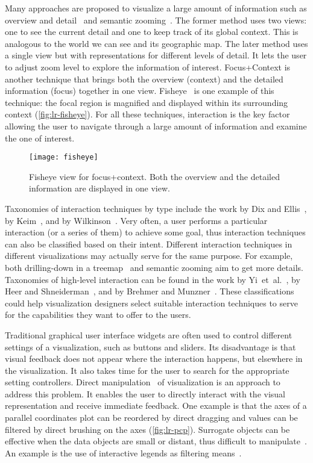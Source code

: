 Many approaches are proposed to visualize a large amount of information such as overview and detail~\cite{Cockburn2008} and semantic zooming~\cite{Perlin1993}. The former method uses two views: one to see the current detail and one to keep track of its global context. This is analogous to the world we can see and its geographic map. The later method uses a single view but with representations for different levels of detail. It lets the user to adjust zoom level to explore the information of interest. Focus+Context is another technique that brings both the overview (context) and the detailed information (focus) together in one view. Fisheye~\cite{Furnas1986,Furnas2006} is one example of this technique: the focal region is magnified and displayed within its surrounding context (\autoref{fig:lr-fisheye}). For all these techniques, interaction is the key factor allowing the user to navigate through a large amount of information and examine the one of interest.

\begin{figure}[!htb]
	\centering	
	\texttt{[image: fisheye]}
	\caption{Fisheye view for focus+context. Both the overview and the detailed information are displayed in one view.} 
\label{fig:lr-fisheye}
\end{figure}

Taxonomies of interaction techniques by type include the work by Dix and Ellis~\cite{Dix1998}, by Keim~\cite{Keim2002}, and by Wilkinson~\cite{Wilkinson2005}. Very often, a user performs a particular interaction (or a series of them) to achieve some goal, thus interaction techniques can also be classified based on their intent. Different interaction techniques in different visualizations may actually serve for the same purpose. For example, both drilling-down in a treemap~\cite{Shneiderman1992} and semantic zooming aim to get more details. Taxonomies of high-level interaction can be found in the work by Yi~et~al.~\cite{Yi2007}, by Heer and Shneiderman~\cite{Heer2012}, and by Brehmer and Munzner~\cite{Brehmer2013}. These classifications could help visualization designers select suitable interaction techniques to serve for the capabilities they want to offer to the users.

Traditional graphical user interface widgets are often used to control different settings of a visualization, such as buttons and sliders. Its disadvantage is that visual feedback does not appear where the interaction happens, but elsewhere in the visualization. It also takes time for the user to search for the appropriate setting controllers. Direct manipulation~\cite{Shneiderman1982} of visualization is an approach to address this problem. It enables the user to directly interact with the visual representation and receive immediate feedback. One example is that the axes of a parallel coordinates plot can be reordered by direct dragging and values can be filtered by direct brushing on the axes (\autoref{fig:lr-pcp}). Surrogate objects can be effective when the data objects are small or distant, thus difficult to manipulate~\cite{Kwon2011}. An example is the use of interactive legends as filtering means~\cite{Riche2010b}.

